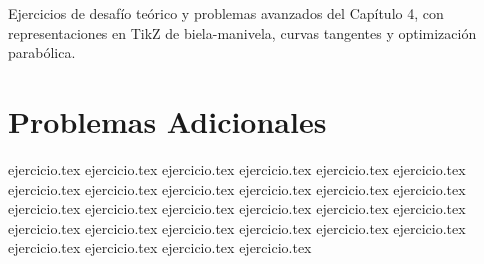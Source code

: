 
Ejercicios de desafío teórico y problemas avanzados del Capítulo 4, con representaciones en TikZ de biela-manivela, curvas tangentes y optimización parabólica.

\section*{Problemas Adicionales}

\begin{enumerate}
    {ejercicio.tex}
    {ejercicio.tex}
    {ejercicio.tex}
    {ejercicio.tex}
    {ejercicio.tex}
    {ejercicio.tex}
    {ejercicio.tex}
    {ejercicio.tex}
    {ejercicio.tex}
    {ejercicio.tex}
    {ejercicio.tex}
    {ejercicio.tex}
    {ejercicio.tex}
    {ejercicio.tex}
    {ejercicio.tex}
    {ejercicio.tex}
    {ejercicio.tex}
    {ejercicio.tex}
    {ejercicio.tex}
    {ejercicio.tex}
    {ejercicio.tex}
    {ejercicio.tex}
    {ejercicio.tex}
    {ejercicio.tex}
    {ejercicio.tex}
    {ejercicio.tex}
    {ejercicio.tex}
    {ejercicio.tex}
\end{enumerate}

